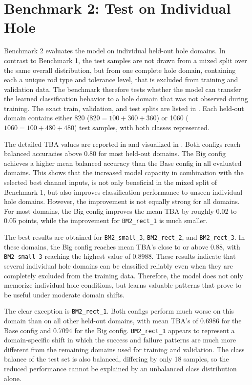 \section{Benchmark 2: Test on Individual Hole}
\label{sec:results_benchmark2}

Benchmark 2 evaluates the model on individual held-out hole domains. In contrast to Benchmark 1, the test samples are not drawn from a mixed split over the same overall distribution, but from one complete hole domain, containing each a unique rod type and tolerance level, that is excluded from training and validation data. The benchmark therefore tests whether the model can transfer the learned classification behavior to a hole domain that was not observed during training. The exact train, validation, and test splits are listed in . Each held-out domain contains either 820 ($820 = 100 + 360 + 360$) or 1060 ($1060 = 100 + 480 + 480$) test samples, with both classes represented.

The detailed TBA values are reported in  and visualized in . Both configs reach balanced accuracies above 0.80 for most held-out domains. The Big config achieves a higher mean balanced accuracy than the Base config in all evaluated domains. This shows that the increased model capacity in combination with the selected best channel inputs, is not only beneficial in the mixed split of Benchmark 1, but also improves classification performance to unseen individual hole domains. However, the improvement is not equally strong for all domains. For most domains, the Big config improves the mean TBA by roughly 0.02 to 0.05 points, while the improvement for \texttt{BM2\_rect\_1} is much smaller.

The best results are obtained for \texttt{BM2\_small\_3}, \texttt{BM2\_rect\_2}, and \texttt{BM2\_rect\_3}. In these domains, the Big config reaches mean TBA's close to or above 0.88, with \texttt{BM2\_small\_3} reaching the highest value of 0.8988. These results indicate that several individual hole domains can be classified reliably even when they are completely excluded from the training data. Therefore, the model does not only memorize individual hole conditions, but learns valuable patterns that prove to be useful under moderate domain shifts.

The clear exception is \texttt{BM2\_rect\_1}. Both configs perform much worse on this domain than on all other held-out domains, with mean TBA's of 0.6986 for the Base config and 0.7094 for the Big config. \texttt{BM2\_rect\_1} appears to represent a domain-specific shift in which the success and failure patterns are much more different from the remaining domains used for training and validation. The class balance of the test set is also balanced, differing by only 18 samples, so the reduced performance cannot be explained by an unbalanced class distribution alone.

